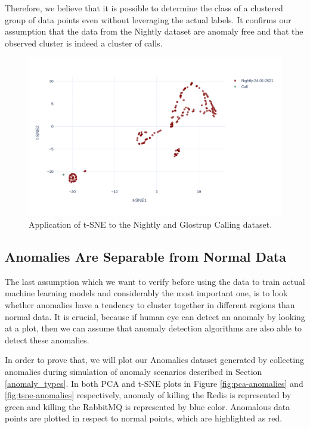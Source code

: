 Therefore, we believe that it is possible to determine the class of a clustered group of data points even without leveraging the actual labels. It confirms our assumption that the data from the Nightly dataset are anomaly free and that the observed cluster is indeed a cluster of calls.

\begin{figure}[h]
    \centering
    \includegraphics[width=\textwidth]{img/tsne-nights-call-comparison.pdf}
    \caption{Application of t-SNE to the Nightly and Glostrup Calling dataset.}
    \label{fig:tsne-nightly-calls}
\end{figure}

\subsection{Anomalies Are Separable from Normal Data}
\label{assumption-anomalies}
The last assumption which we want to verify before using the data to train actual machine learning models and considerably the most important one, is to look whether anomalies have a tendency to cluster together in different regions than normal data. It is crucial, because if human eye can detect an anomaly by looking at a plot, then we can assume that anomaly detection algorithms are also able to detect these anomalies. 

In order to prove that, we will plot our Anomalies dataset generated by collecting anomalies during simulation of anomaly scenarios described in Section \ref{anomaly_types}. In both PCA and t-SNE plots in Figure \ref{fig:pca-anomalies} and \ref{fig:tsne-anomalies} respectively, anomaly of killing the Redis is represented by green and killing the RabbitMQ is represented by blue color. Anomalous data points are plotted in respect to normal points, which are highlighted as red. 

